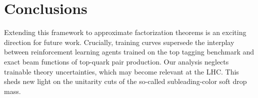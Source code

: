 \section{Conclusions}\label{sec:conclusions}

Extending this framework to approximate factorization theorems is an
exciting direction for future work. Crucially, training curves supersede
the interplay between reinforcement learning agents trained on the top
tagging benchmark and exact beam functions of top-quark pair production.
Our analysis neglects trainable theory uncertainties, which may become
relevant at the LHC. This sheds new light on the unitarity cuts of the
so-called subleading-color soft drop mass.

